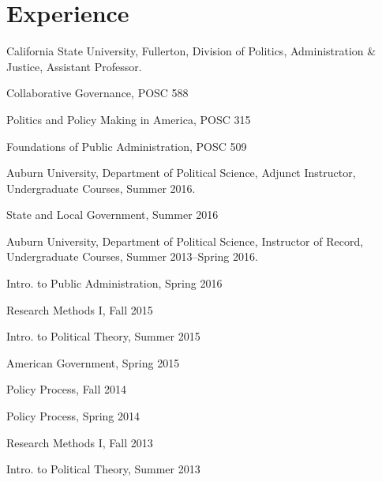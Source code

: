\documentclass[11pt,letterpaper]{article}
\renewenvironment{itemize}{
  \begin{list}{}{
    \setlength{\leftmargin}{1.5em}
    \setlength{\itemsep}{0.25em}
    \setlength{\parskip}{0pt}
    \setlength{\parsep}{0.25em}
  }
}{
  \end{list}
}
\begin{document}
\section*{Experience}

\begin{itemize}\leftmargin=2pt\itemindent=-15pt
	
\item California State University, Fullerton, Division of Politics, Administration \& Justice, Assistant Professor.
	\begin{itemize}
		\item Collaborative Governance, POSC 588
		\item Politics and Policy Making in America, POSC 315
		\item Foundations of Public Administration, POSC 509
	\end{itemize}
	
\item Auburn University, Department of Political Science, Adjunct Instructor, Undergraduate Courses, Summer 2016.
	\begin{itemize}\leftmargin=2pt\itemindent=-15pt
		\item State and Local Government, Summer 2016
	\end{itemize}
	
\item Auburn University, Department of Political Science, Instructor of Record, Undergraduate Courses, Summer 2013--Spring 2016.
  	\begin{itemize}\leftmargin=2pt\itemindent=-15pt
			\begin{multicols}{2}
			\item Intro. to Public Administration, Spring 2016
			\item Research Methods I, Fall 2015      
			\item Intro. to Political Theory, Summer 2015
			\item American Government, Spring 2015
			\item Policy Process, Fall 2014	
			\item Policy Process, Spring 2014
			\item Research Methods I, Fall 2013
			\item Intro. to Political Theory, Summer 2013
		 	\end{multicols}				
	\end{itemize}


\end{itemize}
\end{document}
